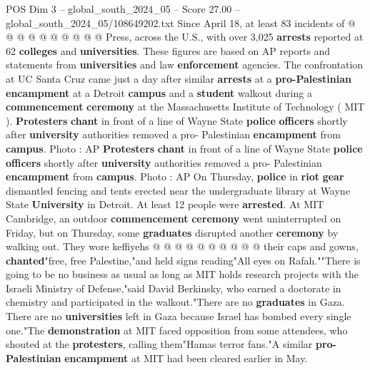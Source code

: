 \begin{textsample}{POS Dim 3 – global\_south\_2024\_05 – Score 27.00 – global\_south\_2024\_05/108649202.txt}
Since April 18, at least 83 incidents of @ @ @ @ @ @ @ @ @ @ Press, across the U.S., with over 3,025 \textbf{arrests} reported at 62 \textbf{colleges} and \textbf{universities}.
These figures are based on AP reports and statements from \textbf{universities} and law \textbf{enforcement} agencies.
The confrontation at UC Santa Cruz came just a day after similar \textbf{arrests} at a \textbf{pro-Palestinian} \textbf{encampment} at a Detroit \textbf{campus} and a \textbf{student} walkout during a \textbf{commencement} \textbf{ceremony} at the Massachusetts Institute of Technology ( MIT ). \textbf{Protesters} \textbf{chant} in front of a line of Wayne State \textbf{police} \textbf{officers} shortly after \textbf{university} authorities removed a pro- Palestinian \textbf{encampment} from \textbf{campus}.
Photo : AP \textbf{Protesters} \textbf{chant} in front of a line of Wayne State \textbf{police} \textbf{officers} shortly after \textbf{university} authorities removed a pro- Palestinian \textbf{encampment} from \textbf{campus}.
Photo : AP On Thursday, \textbf{police} in \textbf{riot} \textbf{gear} dismantled fencing and tents erected near the undergraduate library at Wayne State \textbf{University} in Detroit.
At least 12 people were \textbf{arrested}.
At MIT Cambridge, an outdoor \textbf{commencement} \textbf{ceremony} went uninterrupted on Friday, but on Thursday, some \textbf{graduates} disrupted another \textbf{ceremony} by walking out.
They wore keffiyehs @ @ @ @ @ @ @ @ @ @ their caps and gowns, \textbf{chanted}"free, free Palestine,"and held signs reading"All eyes on Rafah.""There is going to be no business as usual as long as MIT holds research projects with the Israeli Ministry of Defense,"said David Berkinsky, who earned a doctorate in chemistry and participated in the walkout."There are no \textbf{graduates} in Gaza.
There are no \textbf{universities} left in Gaza because Israel has bombed every single one."The \textbf{demonstration} at MIT faced opposition from some attendees, who shouted at the \textbf{protesters}, calling them"Hamas terror fans."A similar \textbf{pro-Palestinian} \textbf{encampment} at MIT had been cleared earlier in May.

\end{textsample}
